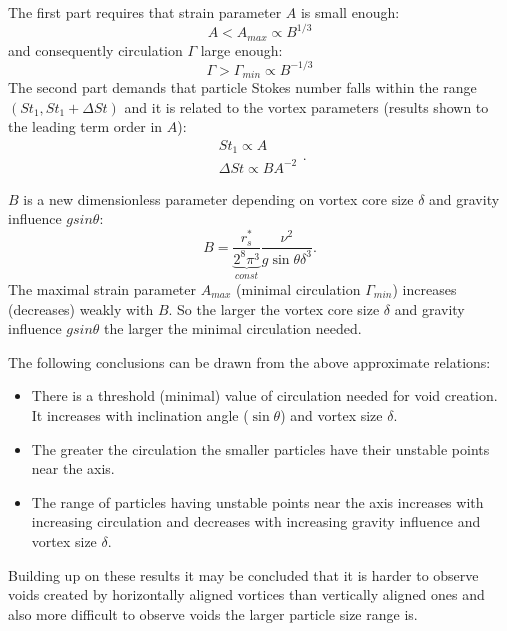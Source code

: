 \documentclass[../main.tex]{subfiles}
\begin{document}
The first part requires that strain parameter $A$ is small enough:
\begin{equation}
A < A_{max} \propto B^{1/3}
\label{eq12}
\end{equation}
and consequently circulation $\Gamma$ large enough:
\begin{equation}
\Gamma > \Gamma_{min} \propto B^{-1/3}
\label{eq13}
\end{equation}
\noindent The second part demands that particle Stokes number falls within the range $(St_1,St_1+\Delta St)$ and it is related to the vortex parameters (results shown to the leading term order in $A$):
\begin{equation}
\begin{array}{l}
St_1 \propto A  \\
\Delta St \propto B A^{-2}
\end{array} .
\label{eq14}
\end{equation}

\noindent $B$ is a new dimensionless parameter depending on vortex core size $\delta$ and gravity influence $g sin\theta$:
\begin{equation}
B=\underbrace{\frac{r^{\ast}_s}{2^8 \pi^3}}_{const} \frac{\nu^2}{g \sin\theta \delta^3}.
\label{eq15}
\end{equation}
\noindent The maximal strain parameter $A_{max}$ (minimal circulation $\Gamma_{min}$) increases (decreases) weakly with $B$. So the larger the vortex core size $\delta$ and gravity influence $g sin\theta$ the larger the minimal circulation needed.

\noindent The following conclusions can be drawn from the above approximate relations:

\begin{itemize}
\item There is a threshold (minimal) value of circulation needed for void creation. It increases with inclination angle ($\sin \theta$) and vortex size $\delta$.
\item The greater the circulation the smaller particles  have their unstable points near the axis.
\item The range of particles having unstable points near the axis increases with increasing circulation and decreases with increasing gravity influence and vortex size $\delta$.
\end{itemize}

\noindent Building up on these results it may be concluded that it is harder to observe voids created by horizontally aligned vortices than vertically aligned ones and also more difficult to observe voids the larger particle size range is.\\
\end{document}
